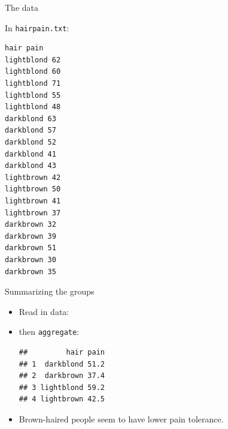 \begin{frame}[fragile]{The data}
  
  In \texttt{hairpain.txt}:
  
  \begin{multicols}{2}
\begin{verbatim}
hair pain
lightblond 62
lightblond 60
lightblond 71
lightblond 55
lightblond 48
darkblond 63
darkblond 57
darkblond 52
darkblond 41
darkblond 43
lightbrown 42
lightbrown 50
lightbrown 41
lightbrown 37
darkbrown 32
darkbrown 39
darkbrown 51
darkbrown 30
darkbrown 35
\end{verbatim}
  \end{multicols}
  
\end{frame}

\begin{frame}[fragile]{Summarizing the groups}
  
  \begin{itemize}
    

  \item Read in data:
    
\begin{knitrout}
\color{fgcolor}\begin{kframe}
\begin{alltt}
\hlkwb{=}\hlstd{(}\hlstd{,}
\end{alltt}
\end{kframe}
\end{knitrout}

\item then \texttt{aggregate}:
  
\begin{knitrout}
\color{fgcolor}\begin{kframe}
\begin{alltt}
\hlopt{~}
\end{alltt}
\begin{verbatim}
##         hair pain
## 1  darkblond 51.2
## 2  darkbrown 37.4
## 3 lightblond 59.2
## 4 lightbrown 42.5
\end{verbatim}
\end{kframe}
\end{knitrout}

\item Brown-haired people seem to have lower pain tolerance. 
  \end{itemize}
  
\end{frame}

